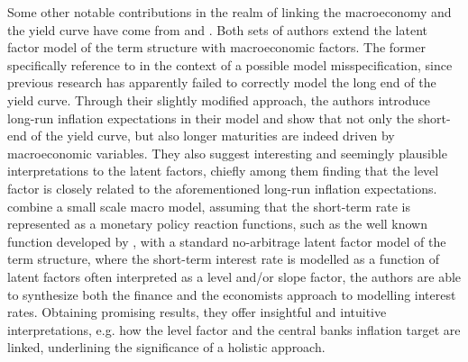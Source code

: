 Some other notable contributions in the realm of linking the macroeconomy and the yield curve have come from \citet{dewachter2006macro} and \citet{rudebusch2008macro}. 
Both sets of authors extend the latent factor model of the term structure with macroeconomic factors. 
The former specifically reference to \citet{ang2003no} in the context of a possible model misspecification, since previous research has apparently failed to correctly model the long end of the yield curve. 
Through their slightly modified approach, the authors introduce long-run inflation expectations in their model and show that not only the short-end of the yield curve, but also longer maturities are indeed driven by macroeconomic variables. 
They also suggest interesting and seemingly plausible interpretations to the latent factors, chiefly among them finding that the level factor is closely related to the aforementioned long-run inflation expectations.
\citet{rudebusch2008macro} combine a small scale macro model, assuming that the short-term rate is represented as a monetary policy reaction functions, such as the well known function developed by \citet{taylor1993discretion}, with a standard no-arbitrage latent factor model of the term structure, where the short-term interest rate is modelled as a function of latent factors often interpreted as a level and/or slope factor,
the authors are able to synthesize both the finance and the economists approach to modelling interest rates. Obtaining promising results, they offer insightful and intuitive interpretations, e.g. how the level factor and the central banks inflation target are linked, underlining the significance of a holistic approach.


